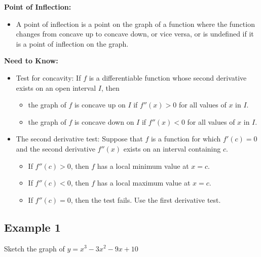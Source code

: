 \documentclass{article}
\begin{document}
\textbf{Point of Inflection:}
\begin{itemize}
    \item A point of inflection is a point on the graph of a function where the function changes from concave up to concave down, or vice versa, or is undefined if it is a point of inflection on the graph.
\end{itemize}

\textbf{Need to Know:}
\begin{itemize}
    \item Test for concavity: If $f$ is a differentiable function whose second derivative exists on an open interval $I$, then
    \begin{itemize}
        \item the graph of $f$ is concave up on $I$ if $f''(x) > 0$ for all values of $x$ in $I$.
        \item the graph of $f$ is concave down on $I$ if $f''(x) < 0$ for all values of $x$ in $I$.
    \end{itemize}
    \item The second derivative test: Suppose that $f$ is a function for which $f'(c) = 0$ and the second derivative $f''(x)$ exists on an interval containing $c$.
    \begin{itemize}
        \item If $f''(c) > 0$, then $f$ has a local minimum value at $x = c$.
        \item If $f''(c) < 0$, then $f$ has a local maximum value at $x = c$.
        \item If $f''(c) = 0$, then the test fails. Use the first derivative test.
    \end{itemize}
\end{itemize}
\newpage
\subsection*{Example 1}
Sketch the graph of $y=x^3-3x^2-9x+10$
\end{document}
